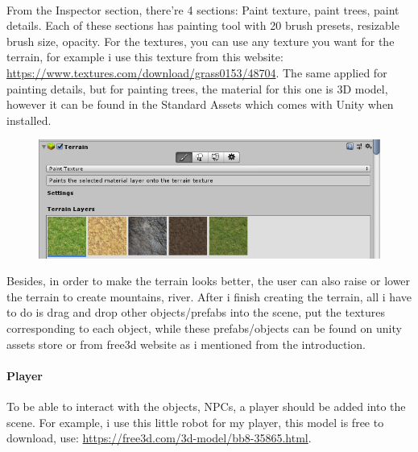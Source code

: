 \documentclass[a4paper, 13pt]{extarticle}
\begin{document}
\begin{figure}[h]
\begin{minipage}{.4\textwidth}
 		  		\label{fig:test3}
 		  	\end{minipage}
 		  \end{figure}
 	  \\[0.15cm]
 	  From the Inspector section, there're 4 sections: Paint texture, paint trees, paint details. Each of these sections has painting tool with 20 brush presets, resizable brush size, opacity. For the textures, you can use any texture you want for the terrain, for example i use this texture from this website: \href{https://www.textures.com/download/grass0153/48704}{https://www.textures.com/download/grass0153/48704}. The same applied for painting details, but for painting trees, the material for this one is 3D model, however it can be found in the Standard Assets which comes with Unity when installed. 
 	   \begin{figure}[h]
 	   	 \centering
 	   	 \begin{minipage}{1\textwidth}
 	   	 	\centering
 	   	 	\includegraphics[width=0.75\linewidth]{intructions/3.png}
 	   	 	\label{fig:test4}
 	   	 \end{minipage}
 		 \end{figure}  
 		 
 	Besides, in order to make the terrain looks better, the user can also raise or lower the terrain to create mountains, river. After i finish creating the terrain, all i have to do is drag and drop other objects/prefabs into the scene, put the textures corresponding to each object, while these prefabs/objects can be found on unity assets store or from free3d website as i mentioned from the introduction. 
 	 \paragraph{Player}
 	 To be able to interact with the objects, NPCs, a player should be added into the scene. For example, i use this little robot for my player, this model is free to download, use: \href{https://free3d.com/3d-model/bb8-35865.html}{https://free3d.com/3d-model/bb8-35865.html}.
 	 
\end{document}
